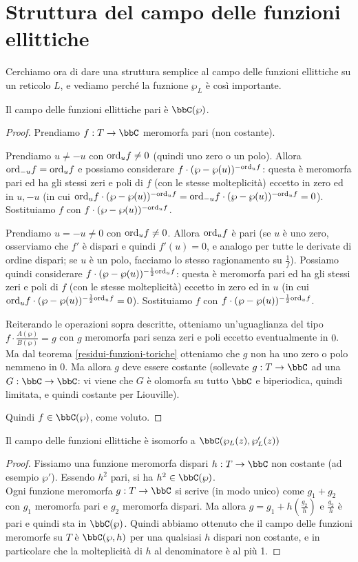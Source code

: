 \section{Struttura del campo delle funzioni ellittiche}
Cerchiamo ora di dare una struttura semplice al campo delle funzioni ellittiche su un reticolo $L$, e vediamo perché la fuznione $\wp_L$ è così importante.

\begin{teorema}
Il campo delle funzioni ellittiche pari è $\bbC(\wp)$.
\end{teorema}
\begin{proof}
Prendiamo $f:T\rar\bbC$ meromorfa pari (non costante).

Prendiamo $u\not=-u$ con $\text{ord}_uf\not=0$ (quindi uno zero o un polo). Allora $\text{ord}_{-u}f=\text{ord}_uf$ e possiamo considerare $f\cdot(\wp-\wp(u))^{-\text{ord}_uf}$:
questa è meromorfa pari ed ha gli stessi zeri e poli di $f$ (con le stesse molteplicità) eccetto
in zero ed in $u,-u$ (in cui $\text{ord}_uf\cdot(\wp-\wp(u))^{-\text{ord}_uf}=\text{ord}_{-u}f\cdot(\wp-\wp(u))^{-\text{ord}_uf}=0$).
Sostituiamo $f$ con $f\cdot(\wp-\wp(u))^{-\text{ord}_uf}$.

Prendiamo $u=-u\not=0$ con $\text{ord}_uf\not=0$. Allora $\text{ord}_uf$ è pari (se $u$ è uno zero, osserviamo che $f'$ è dispari e quindi $f'(u)=0$, e analogo per tutte le derivate di ordine dispari;
se $u$ è un polo, facciamo lo stesso ragionamento su $\frac{1}{f}$). Possiamo quindi considerare $f\cdot(\wp-\wp(u))^{-\frac{1}{2}\text{ord}_uf}$:
questa è meromorfa pari ed ha gli stessi zeri e poli di $f$ (con le stesse molteplicità) eccetto in zero ed in $u$ (in cui $\text{ord}_uf\cdot(\wp-\wp(u))^{-\frac{1}{2}\text{ord}_uf}=0$).
Sostituiamo $f$ con $f\cdot(\wp-\wp(u))^{-\frac{1}{2}\text{ord}_uf}$.

Reiterando le operazioni sopra descritte, otteniamo un'uguaglianza del tipo $f\cdot\frac{A(\wp)}{B(\wp)}=g$ con $g$ meromorfa pari senza zeri e poli eccetto eventualmente in $0$.
Ma dal teorema \ref{residui-funzioni-toriche} otteniamo che $g$ non ha uno zero o polo nemmeno in $0$. Ma allora $g$ deve essere costante
(sollevate $g:T\rar\bbC$ ad una $G:\bbC\rar\bbC$: vi viene che $G$ è olomorfa su tutto $\bbC$ e biperiodica, quindi limitata, e quindi costante per Liouville).

Quindi $f\in\bbC(\wp)$, come voluto.
\end{proof}

\begin{teorema}
    Il campo delle funzioni ellittiche è isomorfo a $\bbC(\wp_L(z),\wp'_L(z))$
\end{teorema}
\begin{proof}
    Fissiamo una funzione meromorfa dispari $h:T\rar\bbC$ non costante (ad esempio $\wp'$).
    Essendo $h^2$ pari, si ha $h^2\in\bbC(\wp)$.\\
    Ogni funzione meromorfa $g:T\rar\bbC$ si scrive (in modo unico) come $g_1+g_2$ con $g_1$ meromorfa pari e $g_2$ meromorfa dispari.
    Ma allora $g=g_1+h(\frac{g_2}{h})$ e $\frac{g_2}{h}$ è pari e quindi sta in $\bbC(\wp)$.
    Quindi abbiamo ottenuto che il campo delle funzioni meromorfe su $T$ è $\bbC(\wp,h)$ per una qualsiasi $h$ dispari non costante, e in particolare che la molteplicità di $h$ al denominatore è al più 1.
\end{proof}

